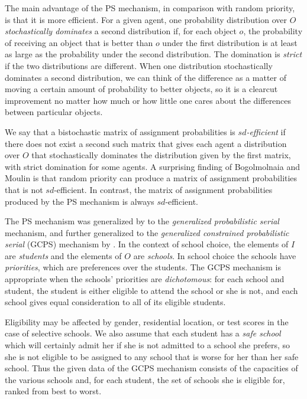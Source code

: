 \documentclass[12pt]{article}
\theoremstyle{definition}
\begin{document}
The main advantage of the PS mechanism, in comparison with random
priority, is that it is more efficient.  For a given agent, one
probability distribution over $O$ \emph{stochastically dominates} a
second distribution if, for each object $o$, the probability of
receiving an object that is better than $o$ under the first
distribution is at least as large as the probability under the second
distribution.  The domination is \emph{strict} if the two
distributions are different. When one distribution stochastically
dominates a second distribution, we can think of the difference as a
matter of moving a certain amount of probability to better objects, so
it is a clearcut improvement no matter how much or how little one
cares about the differences between particular objects.

We say that a bistochastic matrix of assignment probabilities is
\emph{$sd$-efficient} if there does not exist a second such matrix
that gives each agent a distribution over $O$ that stochastically
dominates the distribution given by the first matrix, with strict
domination for some agents.  A surprising finding of Bogolmolnaia and
Moulin is that random priority can produce a matrix of assignment
probabilities that is not $sd$-efficient.  In contrast, the matrix of
assignment probabilities produced by the PS mechanism is always
$sd$-efficient.

The PS mechanism was generalized by \cite{bckm13aer} to the
\emph{generalized probabilistic serial} mechanism, and further
generalized to the \emph{generalized constrained probabilistic serial}
(GCPS) mechanism by \cite{balbuzanov22jet}.  In the context of school
choice, the elements of $I$ are \emph{students} and the elements of
$O$ are \emph{schools}.  In school choice the schools have
\emph{priorities}, which are preferences over the students.  The GCPS
mechanism is appropriate when the schools' priorities are
\emph{dichotomous}: for each school and student, the student is either
eligible to attend the school or she is not, and each school gives
equal consideration to all of its eligible students.

Eligibility may be affected by gender, residential location, or test
scores in the case of selective schools.  We also assume that each
student has a \emph{safe school} which will certainly admit her if she
is not admitted to a school she prefers, so she is not eligible to be
assigned to any school that is worse for her than her safe school.
Thus the given data of the GCPS mechanism consists of the capacities
of the various schools and, for each student, the set of schools she
is eligible for, ranked from best to worst.
\end{document}
